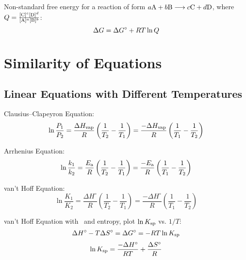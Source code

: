 \documentclass[10pt]{article}
\begin{document}
Non-standard free energy for a reaction of form $a\textnormal{A}+b\textnormal{B} \longrightarrow c\textnormal{C}+d\textnormal{D}$, where $Q = \frac{[\textnormal{C}]^c[\textnormal{D}]^d}{[\textnormal{A}]^a[\textnormal{B}]^b}$:
\begin{equation*}
\Delta G = \Delta G\not + RT\ln Q
\end{equation*}


\section{Similarity of Equations}

\subsection{Linear Equations with Different Temperatures}

Clausius--Clapeyron Equation:
\begin{equation*}
\ln \frac{P_1}{P_2} = \frac{\Delta H_\textnormal{vap}}{R}\left(\frac{1}{T_2} - \frac{1}{T_1}\right) = \frac{-\Delta H_\textnormal{vap}}{R}\left(\frac{1}{T_1} - \frac{1}{T_2}\right)
\end{equation*}

Arrhenius Equation:
\begin{equation*}
\ln \frac{k_1}{k_2} = \frac{E_\textnormal{a}}{R}\left(\frac{1}{T_2} - \frac{1}{T_1}\right) = \frac{-E_\textnormal{a}}{R}\left(\frac{1}{T_1}-\frac{1}{T_2}\right)
\end{equation*}

van't Hoff Equation:
\begin{equation*}
\ln \frac{K_1}{K_2} = \frac{\Delta H^\circ}{R}\left(\frac{1}{T_2}-\frac{1}{T_1}\right) = \frac{-\Delta H^\circ}{R}\left(\frac{1}{T_1}-\frac{1}{T_2}\right)
\end{equation*}

van't Hoff Equation with \Ksp\ and entropy, plot $\ln K_\textnormal{sp}$ vs. $1/T$:
\begin{equation*}
\Delta H^{\circ} - T\Delta S^{\circ} = \Delta G^{\circ} = -RT \ln K_\textnormal{sp}
\end{equation*}
\begin{equation*}
\ln K_\textnormal{sp} = \frac{-\Delta H^{\circ}}{RT} + \frac{\Delta S^{\circ}}{R}
\end{equation*}
\end{document}

